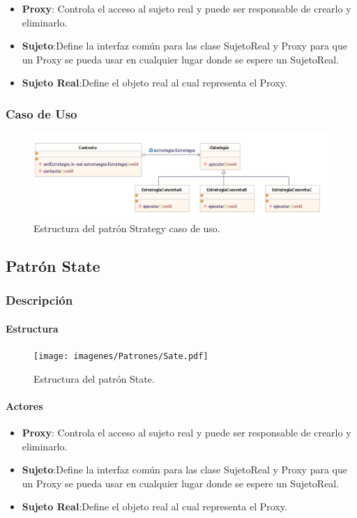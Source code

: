 \begin{itemize}
	\item \textbf{Proxy}: Controla el acceso al sujeto real y puede ser responsable de crearlo y eliminarlo.
	\item \textbf{Sujeto}:Define la interfaz común para las clase SujetoReal y Proxy para que un Proxy se pueda usar en cualquier lugar donde se espere un SujetoReal.
	\item \textbf{Sujeto Real}:Define el objeto real al cual representa el Proxy.
\end{itemize}


\subsubsection{Caso de Uso}
\begin{figure}[th!]
	\centering
	\includegraphics[width=.7\linewidth]{imagenes/Patrones/Strategy_caso.pdf}
	\caption{Estructura del patrón Strategy caso de uso.\cite{gof}}	
\end{figure}

\subsection{Patrón State}

\subsubsection{Descripción}

\paragraph{Estructura}

\begin{figure}[th!]
	\centering
	\texttt{[image: imagenes/Patrones/Sate.pdf]}
	\caption{Estructura del patrón State.\cite{gof}}	
\end{figure}

\paragraph{Actores}

\begin{itemize}
	\item \textbf{Proxy}: Controla el acceso al sujeto real y puede ser responsable de crearlo y eliminarlo.
	\item \textbf{Sujeto}:Define la interfaz común para las clase SujetoReal y Proxy para que un Proxy se pueda usar en cualquier lugar donde se espere un SujetoReal.
	\item \textbf{Sujeto Real}:Define el objeto real al cual representa el Proxy.
\end{itemize}


